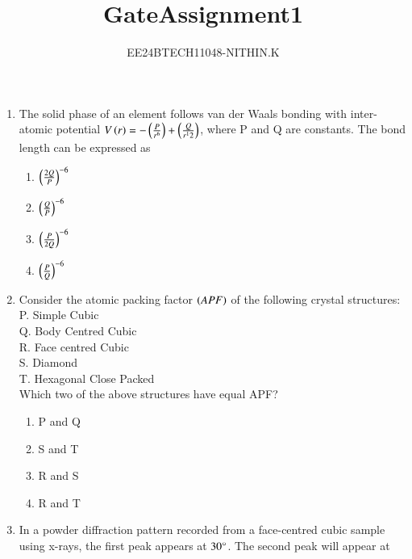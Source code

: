 \documentclass[journal]{IEEEtran}
\numberwithin{equation}{enumi}
\numberwithin{figure}{enumi}
\begin{document}


\title{GateAssignment1}
\author{EE24BTECH11048-NITHIN.K} 
{\let\newpage\relax\maketitle}
\begin{enumerate}
\section{Q.21 to Q.75 carry two marks each.}
	\item The solid phase of an element follows van der Waals bonding with inter-atomic potential $V\left(r\right) = -\left(\frac{P}{r^6}\right) + \left(\frac{Q}{r^12}\right)$, where P and Q are constants. The bond length can be expressed as
		\begin{enumerate}
			\item $\left(\frac{2Q}{P}\right)^{-6}$
			\item $\left(\frac{Q}{P}\right)^{-6}$
			\item $\left(\frac{P}{2Q}\right)^{-6}$
			\item $\left(\frac{P}{Q}\right)^{-6}$
		\end{enumerate}
	\item Consider the atomic packing factor $\left(APF\right)$ of the following crystal structures: \\
		P. Simple Cubic \\
		Q. Body Centred Cubic \\
		R. Face centred Cubic \\
		S. Diamond \\
		T. Hexagonal Close Packed \\
		Which two of the above structures have equal APF?
		\begin{enumerate}
			\item P and Q
			\item S and T
			\item R and S
			\item R and T
		\end{enumerate}
	\item In a powder diffraction pattern recorded from a face-centred cubic sample using x-rays, the first peak appears at $30\degree$. The second peak will appear at
		\begin{enumerate}

\end{enumerate}
\end{enumerate}
\end{document}

